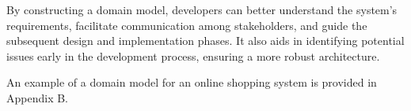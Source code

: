 By constructing a domain model, developers can better understand the system's requirements, facilitate communication among stakeholders, and guide the subsequent design and implementation phases. It also aids in identifying potential issues early in the development process, ensuring a more robust architecture.

An example of a domain model for an online shopping system is provided in Appendix B.
